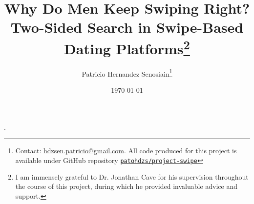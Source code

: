 \begin{titlepage}
    \title{Why Do Men Keep Swiping Right? Two-Sided Search in Swipe-Based Dating Platforms\thanks{I am immensely grateful to Dr. Jonathan Cave for his supervision throughout the course of this project, during which he provided invaluable advice and support.}}
    \author{Patricio Hernandez Senosiain\thanks{Contact: \href{mailto:hdzsen.patricio@gmail.com}{hdzsen.patricio@gmail.com}. All code produced for this project is available under GitHub repository \href{https://github.com/patohdzs/project-swipe}{\texttt{patohdzs/project-swipe}}}}.
    \date{\today}
    \maketitle
     
    \setcounter{page}{0}
    \thispagestyle{empty}
\end{titlepage}